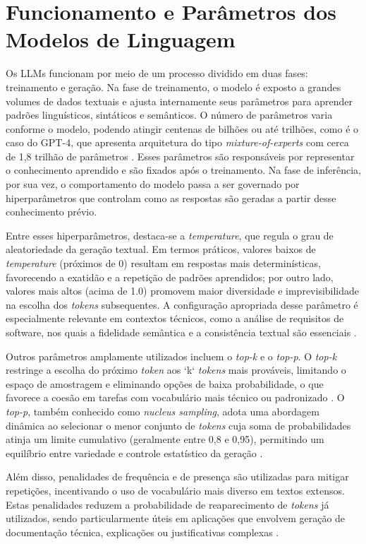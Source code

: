 \section{Funcionamento e Parâmetros dos Modelos de Linguagem}

Os LLMs funcionam por meio de um processo dividido em duas fases: treinamento e geração. Na fase de treinamento, o modelo é exposto a grandes volumes de dados textuais e ajusta internamente seus parâmetros para aprender padrões linguísticos, sintáticos e semânticos. O número de parâmetros varia conforme o modelo, podendo atingir centenas de bilhões ou até trilhões, como é o caso do GPT-4, que apresenta arquitetura do tipo \textit{mixture-of-experts} com cerca de 1,8 trilhão de parâmetros . Esses parâmetros são responsáveis por representar o conhecimento aprendido e são fixados após o treinamento. Na fase de inferência, por sua vez, o comportamento do modelo passa a ser governado por hiperparâmetros que controlam como as respostas são geradas a partir desse conhecimento prévio.

Entre esses hiperparâmetros, destaca-se a \textit{temperature}, que regula o grau de aleatoriedade da geração textual. Em termos práticos, valores baixos de \textit{temperature} (próximos de 0) resultam em respostas mais determinísticas, favorecendo a exatidão e a repetição de padrões aprendidos; por outro lado, valores mais altos (acima de 1.0) promovem maior diversidade e imprevisibilidade na escolha dos \textit{tokens} subsequentes. A configuração apropriada desse parâmetro é especialmente relevante em contextos técnicos, como a análise de requisitos de software, nos quais a fidelidade semântica e a consistência textual são essenciais .

Outros parâmetros amplamente utilizados incluem o \textit{top-k} e o \textit{top-p}. O \textit{top-k} restringe a escolha do próximo \textit{token} aos `k` \textit{tokens} mais prováveis, limitando o espaço de amostragem e eliminando opções de baixa probabilidade, o que favorece a coesão em tarefas com vocabulário mais técnico ou padronizado . O \textit{top-p}, também conhecido como \textit{nucleus sampling}, adota uma abordagem dinâmica ao selecionar o menor conjunto de \textit{tokens} cuja soma de probabilidades atinja um limite cumulativo (geralmente entre 0,8 e 0,95), permitindo um equilíbrio entre variedade e controle estatístico da geração .

Além disso, penalidades de frequência e de presença são utilizadas para mitigar repetições, incentivando o uso de vocabulário mais diverso em textos extensos. Estas penalidades reduzem a probabilidade de reaparecimento de \textit{tokens} já utilizados, sendo particularmente úteis em aplicações que envolvem geração de documentação técnica, explicações ou justificativas complexas .

